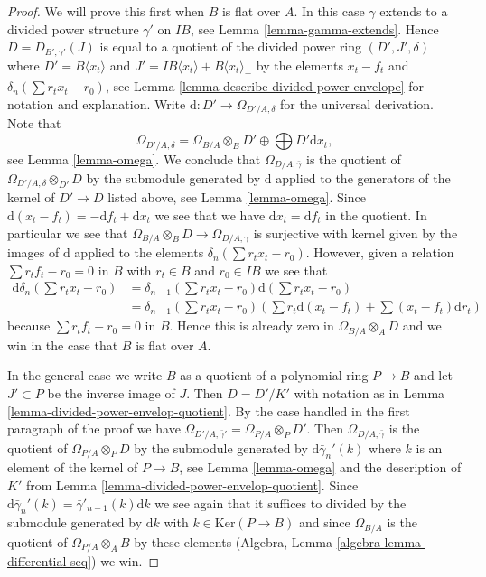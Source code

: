 \begin{proof}
We will prove this first when $B$ is flat over $A$. In this case $\gamma$
extends to a divided power structure $\gamma'$ on $IB$, see
Lemma \ref{lemma-gamma-extends}.
Hence $D = D_{B', \gamma'}(J)$ is equal to a quotient of
the divided power ring $(D', J', \delta)$ where $D' =  B\langle x_t \rangle$
and $J' = IB\langle x_t \rangle + B\langle x_t \rangle_{+}$
by the elements $x_t - f_t$ and $\delta_n(\sum r_t x_t - r_0)$, see
Lemma \ref{lemma-describe-divided-power-envelope} for notation
and explanation. Write $\text{d} : D' \to \Omega_{D'/A, \delta}$
for the universal derivation. Note that
$$
\Omega_{D'/A, \delta} =
\Omega_{B/A} \otimes_B D' \oplus \bigoplus D' \text{d}x_t,
$$
see Lemma \ref{lemma-omega}. We conclude that $\Omega_{D/A, \bar\gamma}$
is the quotient of $\Omega_{D'/A, \delta} \otimes_{D'} D$ by the submodule
generated by $\text{d}$ applied to the generators of the
kernel of $D' \to D$ listed above, see Lemma \ref{lemma-omega}.
Since $\text{d}(x_t - f_t) = - \text{d}f_t + \text{d}x_t$
we see that we have $\text{d}x_t = \text{d}f_t$ in the quotient.
In particular we see that $\Omega_{B/A} \otimes_B D \to \Omega_{D/A, \gamma}$
is surjective with kernel given by the images of $\text{d}$
applied to the elements $\delta_n(\sum r_t x_t - r_0)$.
However, given a relation $\sum r_tf_t - r_0 = 0$ in $B$ with
$r_t \in B$ and $r_0 \in IB$ we see that
\begin{align*}
\text{d}\delta_n(\sum r_t x_t - r_0)
& =
\delta_{n - 1}(\sum r_t x_t - r_0)\text{d}(\sum r_t x_t - r_0)
\\
& =
\delta_{n - 1}(\sum r_t x_t - r_0)
\left(
\sum r_t\text{d}(x_t - f_t) + \sum (x_t - f_t)\text{d}r_t
\right)
\end{align*}
because $\sum r_tf_t - r_0 = 0$ in $B$. Hence this is already zero in
$\Omega_{B/A} \otimes_A D$ and we win in the case that $B$ is flat over $A$.

\medskip\noindent
In the general case we write $B$ as a quotient of a polynomial ring
$P \to B$ and let $J' \subset P$ be the inverse image of $J$. Then
$D = D'/K'$ with notation as in
Lemma \ref{lemma-divided-power-envelop-quotient}.
By the case handled in the first paragraph of the proof we have
$\Omega_{D'/A, \bar\gamma'} = \Omega_{P/A} \otimes_P D'$. Then
$\Omega_{D/A, \bar \gamma}$ is the quotient of $\Omega_{P/A} \otimes_P D$
by the submodule generated by $\text{d}\bar\gamma_n'(k)$ where $k$
is an element of the kernel of $P \to B$, see
Lemma \ref{lemma-omega} and the description of $K'$ from
Lemma \ref{lemma-divided-power-envelop-quotient}. Since
$\text{d}\bar\gamma_n'(k) = \bar\gamma'_{n - 1}(k)\text{d}k$ we see
again that it suffices to divided by the submodule generated by
$\text{d}k$ with $k \in \text{Ker}(P \to B)$ and since $\Omega_{B/A}$
is the quotient of $\Omega_{P/A} \otimes_A B$ by these elements
(Algebra, Lemma \ref{algebra-lemma-differential-seq}) we win.
\end{proof}


